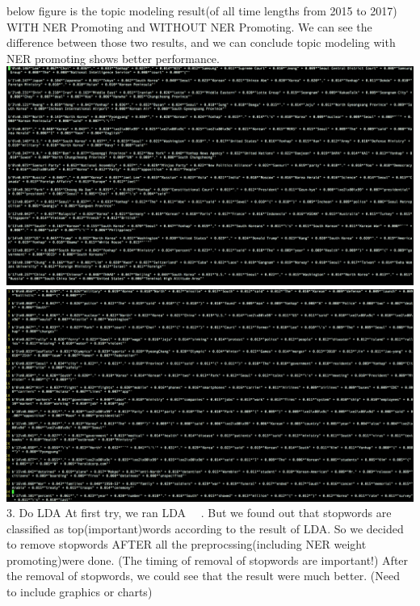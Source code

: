 below figure is the topic modeling result(of all time lengths from 2015 to 2017) WITH NER Promoting and WITHOUT NER Promoting. We can see the difference between those two results, and we can conclude topic modeling with NER promoting shows better performance.
\includegraphics[scale= 0.4]{after_ner.png}
\includegraphics[scale= 0.4]{before_ner.png}
3. Do LDA
At first try, we ran LDA ~~.
But we found out that stopwords are classified as top(important)words according to the result of LDA. So we decided to remove stopwords AFTER all the preprocssing(including NER weight promoting)were done. (The timing of removal of stopwords are important!) After the removal of stopwords, we could see that the result were much better. (Need to include graphics or charts)
